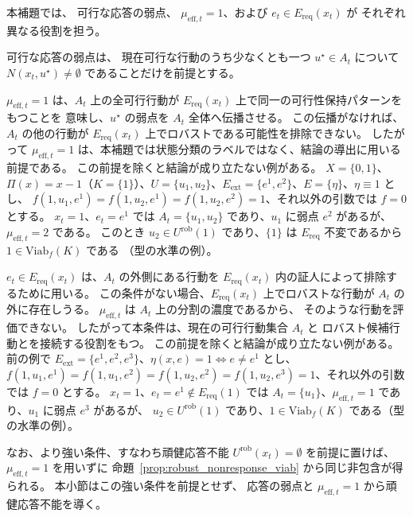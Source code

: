 \begin{remark}
\label{rem:sd_viab_structure}
本補題では、
可行な応答の弱点、
$\mu_{\mathrm{eff},t}=1$、および
$e_t\in E_{\mathrm{req}}(x_t)$ が
それぞれ異なる役割を担う。

可行な応答の弱点は、
現在可行な行動のうち少なくとも一つ $u^\star\in A_t$ について
$N(x_t,u^\star)\neq\emptyset$ であることだけを前提とする。

$\mu_{\mathrm{eff},t}=1$ は、$A_t$ 上の全可行行動が
$E_{\mathrm{req}}(x_t)$ 上で同一の可行性保持パターンをもつことを
意味し、$u^\star$ の弱点を $A_t$ 全体へ伝播させる。
この伝播がなければ、$A_t$ の他の行動が
$E_{\mathrm{req}}(x_t)$ 上でロバストである可能性を排除できない。
したがって $\mu_{\mathrm{eff},t}=1$ は、本補題では状態分類のラベルではなく、結論の導出に用いる前提である。
この前提を除くと結論が成り立たない例がある。
$X=\{0,1\}$、$\Pi(x)=x-1$（$K=\{1\}$）、$U=\{u_1,u_2\}$、$E_{\mathrm{ext}}=\{e^1,e^2\}$、$E=\{\eta\}$、$\eta\equiv1$ とし、
$f(1,u_1,e^1)=f(1,u_2,e^1)=f(1,u_2,e^2)=1$、それ以外の引数では $f=0$ とする。
$x_t=1$、$e_t=e^1$ では $A_t=\{u_1,u_2\}$ であり、$u_1$ に弱点 $e^2$ があるが、$\mu_{\mathrm{eff},t}=2$ である。
このとき $u_2\in U^{\mathrm{rob}}(1)$ であり、$\{1\}$ は $E_{\mathrm{req}}$ 不変であるから $1\in\mathrm{Viab}_f(K)$ である
（型の水準の例）。

$e_t\in E_{\mathrm{req}}(x_t)$ は、$A_t$ の外側にある行動を
$E_{\mathrm{req}}(x_t)$ 内の証人によって排除するために用いる。
この条件がない場合、$E_{\mathrm{req}}(x_t)$ 上でロバストな行動が
$A_t$ の外に存在しうる。
$\mu_{\mathrm{eff},t}$ は $A_t$ 上の分割の濃度であるから、
そのような行動を評価できない。
したがって本条件は、現在の可行行動集合 $A_t$ と
ロバスト候補行動とを接続する役割をもつ。
この前提を除くと結論が成り立たない例がある。
前の例で $E_{\mathrm{ext}}=\{e^1,e^2,e^3\}$、$\eta(x,e)=1\iff e\neq e^1$ とし、
$f(1,u_1,e^1)=f(1,u_1,e^2)=f(1,u_2,e^2)=f(1,u_2,e^3)=1$、それ以外の引数では $f=0$ とする。
$x_t=1$、$e_t=e^1\notin E_{\mathrm{req}}(1)$ では $A_t=\{u_1\}$、$\mu_{\mathrm{eff},t}=1$ であり、$u_1$ に弱点 $e^3$ があるが、
$u_2\in U^{\mathrm{rob}}(1)$ であり、$1\in\mathrm{Viab}_f(K)$ である（型の水準の例）。

なお、より強い条件、すなわち頑健応答不能 $U^{\mathrm{rob}}(x_t)=\emptyset$ を前提に置けば、
$\mu_{\mathrm{eff},t}=1$ を用いずに
命題~\ref{prop:robust_nonresponse_viab} から同じ非包含が得られる。
本小節はこの強い条件を前提とせず、
応答の弱点と $\mu_{\mathrm{eff},t}=1$ から頑健応答不能を導く。
\end{remark}

